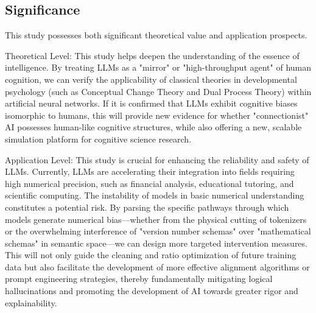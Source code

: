 \subsection{Significance}

This study possesses both significant theoretical value and application prospects.

Theoretical Level: This study helps deepen the understanding of the essence of intelligence. By treating LLMs as a "mirror" or "high-throughput agent" of human cognition, we can verify the applicability of classical theories in developmental psychology (such as Conceptual Change Theory and Dual Process Theory) within artificial neural networks. If it is confirmed that LLMs exhibit cognitive biases isomorphic to humans, this will provide new evidence for whether "connectionist" AI possesses human-like cognitive structures, while also offering a new, scalable simulation platform for cognitive science research\cite{vosniadou1994}.

Application Level: This study is crucial for enhancing the reliability and safety of LLMs. Currently, LLMs are accelerating their integration into fields requiring high numerical precision, such as financial analysis, educational tutoring, and scientific computing. The instability of models in basic numerical understanding constitutes a potential risk. By parsing the specific pathways through which models generate numerical bias—whether from the physical cutting of tokenizers or the overwhelming interference of "version number schemas" over "mathematical schemas" in semantic space—we can design more targeted intervention measures. This will not only guide the cleaning and ratio optimization of future training data but also facilitate the development of more effective alignment algorithms or prompt engineering strategies, thereby fundamentally mitigating logical hallucinations\cite{turpin2023} and promoting the development of AI towards greater rigor and explainability.
